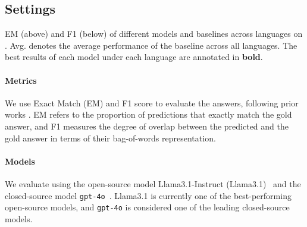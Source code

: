 \subsection{Settings}

\begin{table*}[ht]
\centering
\tiny

\caption{
EM (above) and F1 (below) of different models and baselines across languages on \ourdataset.
Avg. denotes the average performance of the baseline across all languages.
The best results of each model under each language are annotated in \textbf{bold}. 
}
\label{tab:main}
\end{table*}

\paragraph{Metrics}
We use Exact Match (EM) and F1 score to evaluate the answers, following prior works \cite{chen-etal-2020-hybridqa,zhu-etal-2021-tat}. 
EM refers to the proportion of predictions that exactly match the gold answer, and F1 measures the degree of overlap between the predicted and the gold answer in terms of their bag-of-words representation.

\paragraph{Models}
We evaluate \ourdataset using the open-source model Llama3.1-Instruct (Llama3.1)~\cite{dubey-etal-2024-llama3.1} and the closed-source model \texttt{gpt-4o}~\cite{openai2024gpt4technicalreport}. 
Llama3.1 is currently one of the best-performing open-source models, and \texttt{gpt-4o} is considered one of the leading closed-source models.


